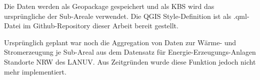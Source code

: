 			Die Daten werden als Geopackage gespeichert und als KBS wird das ursprüngliche der Sub-Areale verwendet. Die QGIS Style-Definition ist als .qml-Datei im Github-Repository dieser Arbeit bereit gestellt. \cite{web_github_repo_code} 
			
			Ursprünglich geplant war noch die Aggregation von Daten zur Wärme- und Stromerzeugung je Sub-Areal aus dem Datensatz für Energie-Erzeugungs-Anlagen Standorte NRW des LANUV. Aus Zeitgründen wurde diese Funktion jedoch nicht mehr implementiert.
			
			